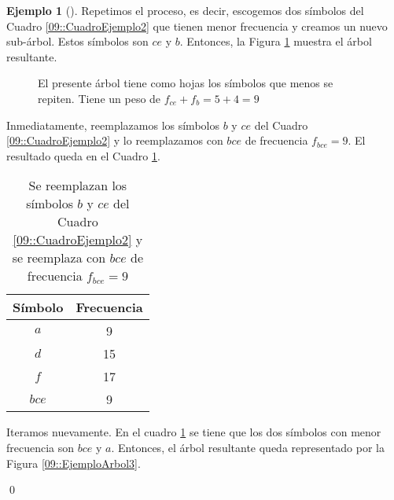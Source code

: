 \documentclass[english, spanish, fleqn, 10pt]{article}
\numberwithin{equation}{section}
\theoremstyle{definition}
\newtheorem{beforeExample}{Ejemplo}[section]
\newenvironment{ejemplo}[1][]{\begin{beforeExample}[#1]\renewcommand{\qedsymbol}{$\blacksquare$}}{\qed\end{beforeExample}}
\begin{document}
\begin{ejemplo}
Repetimos el proceso, es decir, escogemos dos símbolos del Cuadro \ref{09::CuadroEjemplo2} que tienen menor frecuencia y creamos un nuevo sub-árbol. Estos símbolos son $ce$ y $b$. Entonces, la Figura \ref{09::EjemploArbol2} muestra el árbol resultante.
\begin{figure}[!h]
	\centering
	\caption{El presente árbol tiene como hojas los símbolos que menos se repiten. Tiene un peso de $f_{ce}+f_{b}=5+4=9$}
	\label{09::EjemploArbol2}
\end{figure}

Inmediatamente, reemplazamos los símbolos $b$ y $ce$ del Cuadro \ref{09::CuadroEjemplo2} y lo reemplazamos con $bce$ de frecuencia $f_{bce}=9$. El resultado queda en el Cuadro \ref{09::CuadroEjemplo3}.
\begin{table}[!h]
	\centering
	\begin{tabular}{c|c}
		Símbolo&Frecuencia\\
		\hline
		$a$&9\\
		$d$&15\\
		$f$&17\\
		$bce$&9
	\end{tabular}
	\caption{Se reemplazan los símbolos $b$ y $ce$ del Cuadro \ref{09::CuadroEjemplo2} y se reemplaza con $bce$ de frecuencia $f_{bce}=9$}
	\label{09::CuadroEjemplo3}
\end{table}

Iteramos nuevamente. En el cuadro \ref{09::CuadroEjemplo3} se tiene que los dos símbolos con menor frecuencia son $bce$ y $a$. Entonces, el árbol resultante queda representado por la Figura \ref{09::EjemploArbol3}.
\begin{figure}[!h]
	\centering
\end{figure}
\end{ejemplo}
\end{document}
